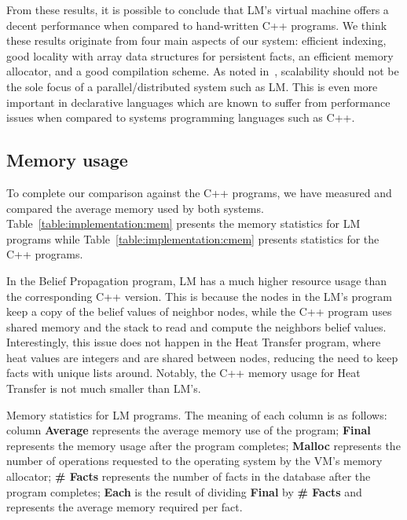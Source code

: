 From these results, it is possible to conclude that LM's virtual machine offers
a decent performance when compared to hand-written C++ programs. We think these
results originate from four main aspects of our system: efficient indexing, good
locality with array data structures for persistent facts, an efficient memory
allocator, and a good compilation scheme. As noted in~\cite{cost}, scalability
should not be the sole focus of a parallel/distributed system such as LM. This
is even more important in declarative languages which are known to suffer from
performance issues when compared to systems programming languages such as C++.

\subsection{Memory usage}

To complete our comparison against the C++ programs, we have measured and
compared the average memory used by both systems.
Table~\ref{table:implementation:mem} presents the memory statistics for LM
programs while Table~\ref{table:implementation:cmem} presents statistics for the
C++ programs.

In the Belief Propagation program, LM has a much higher resource usage than the
corresponding C++ version. This is because the nodes in the LM's program keep a
copy of the belief values of neighbor nodes, while the C++ program uses shared
memory and the stack to read and compute the neighbors belief values.
Interestingly, this issue does not happen in the Heat Transfer program, where
heat values are integers and are shared between nodes, reducing the need to keep
facts with unique lists around. Notably, the C++ memory usage for Heat Transfer
is not much smaller than LM's.

\begin{table}[ht]
   \begin{center}
      
   \end{center}
   \caption{Memory statistics for LM programs. The meaning of each column is as
      follows: column \textbf{Average} represents the average memory use of the
      program; \textbf{Final} represents the memory usage after the program
      completes; \textbf{Malloc} represents the number of 
   operations requested to the operating system by the VM's memory allocator;
   \textbf{\# Facts} represents the number of facts in the database after the
   program completes; \textbf{Each} is the result of dividing \textbf{Final} by
   \textbf{\# Facts} and represents the average memory required per fact.}
   \label{table:implementation:mem}
\end{table}

